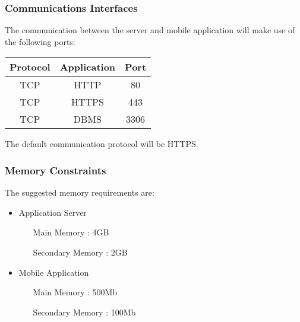 \documentclass[11pt, a4paper,titlepage]{article}
\begin{document}
\subsubsection{Communications Interfaces}
	The communication between the server and mobile application will make use of the following ports:
	\newline \newline
	\begin{tabular}{c c c}
		\textbf{Protocol} & \textbf{Application} & \textbf{Port} \\
		\hline
		TCP & HTTP & 80 \\
		\hline
		TCP & HTTPS & 443 \\
		\hline
		TCP & DBMS & 3306 \\
		\hline
	\end{tabular}
	\newline
	The default communication protocol will be HTTPS.
	
\subsubsection{Memory Constraints}
The suggested memory requirements are: \newline
\begin{itemize}
	\item Application Server
	\begin{itemize}
		\item[Main Memory]: 4GB
		\item[Secondary Memory]: 2GB
	\end{itemize}
	\item Mobile Application
	\begin{itemize}
			\item[Main Memory]: 500Mb
			\item[Secondary Memory]: 100Mb
	\end{itemize}
\end{itemize}
\end{document}
